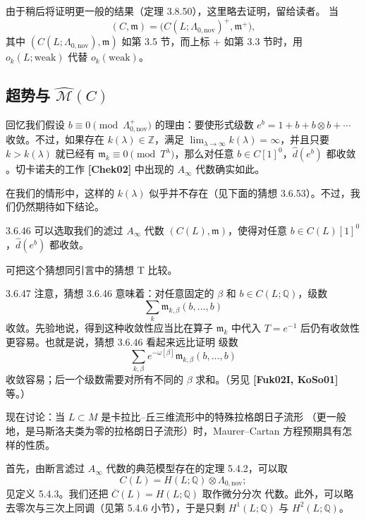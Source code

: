 由于稍后将证明更一般的结果（定理 3.8.50），这里略去证明，留给读者。
当
\[
  (C,\mathfrak m)
  =\bigl(C(L;\Lambda_{0,\mathrm{nov}})^+,\mathfrak m^+\bigr),
\]
其中 $(C(L;\Lambda_{0,\mathrm{nov}}),\mathfrak m)$ 如第 3.5 节，而上标
$+$ 如第 3.3 节时，用 $o_k(L;\mathrm{weak})$ 代替
$o_k(\mathrm{weak})$。

\subsection{超势与 $\widehat{\mathcal M}(C)$}
\label{subsec:3-6-4}

回忆我们假设
$b\equiv0\pmod{\Lambda^+_{0,\mathrm{nov}}}$ 的理由：要使形式级数
$e^b=1+b+b\otimes b+\cdots$ 收敛。不过，如果存在
$k(\lambda)\in\mathbb Z$，满足
$\lim_{\lambda\to\infty}k(\lambda)=\infty$，并且只要
$k>k(\lambda)$ 就已经有
$\mathfrak m_k\equiv0\pmod{T^\lambda}$，那么对任意
$b\in C[1]^0$，$\widehat d(e^b)$ 都收敛
。切卡诺夫的工作 \textbf{[Chek02]} 中出现的
$A_\infty$ 代数确实如此。

在我们的情形中，这样的 $k(\lambda)$ 似乎并不存在（见下面的猜想
3.6.53）。不过，我们仍然期待如下结论。

\begin{conjecture}{3.6.46}\label{conj:3-6-46}
可以选取我们的滤过 $A_\infty$ 代数 $(C(L),\mathfrak m)$，使得对任意
$b\in C(L)[1]^0$，$\widehat d(e^b)$ 都收敛。
\end{conjecture}

可把这个猜想同引言中的猜想 T 比较。

\begin{remark}{3.6.47}\label{rem:3-6-47}
注意，猜想 3.6.46 意味着：对任意固定的 $\beta$ 和
$b\in C(L;\mathbb Q)$，级数
\[
  \sum_k\mathfrak m_{k,\beta}(b,\ldots,b)
\]
收敛。先验地说，得到这种收敛性应当比在算子 $\mathfrak m_k$ 中代入
$T=e^{-1}$ 后仍有收敛性更容易。也就是说，猜想 3.6.46 看起来远比证明
级数
\[
  \sum_{k,\beta}e^{-\omega[\beta]}
  \mathfrak m_{k,\beta}(b,\ldots,b)
\]
收敛容易；后一个级数需要对所有不同的 $\beta$ 求和。（另见
\textbf{[Fuk02I, KoSo01]} 等。）
\end{remark}

现在讨论：当 $L\subset M$ 是卡拉比--丘三维流形中的特殊拉格朗日子流形
（更一般地，是马斯洛夫类为零的拉格朗日子流形）时，Maurer--Cartan
方程预期具有怎样的性质。

首先，由断言滤过 $A_\infty$ 代数的典范模型存在的定理 5.4.2，可以取
\[
  C(L)=H(L;\mathbb Q)\otimes\Lambda_{0,\mathrm{nov}};
\]
见定义 5.4.3。我们还把 $\overline C(L)=H(L;\mathbb Q)$ 取作微分分次
代数。此外，可以略去零次与三次上同调（见第 5.4.6 小节），于是只剩
$H^1(L;\mathbb Q)$ 与 $H^2(L;\mathbb Q)$。

